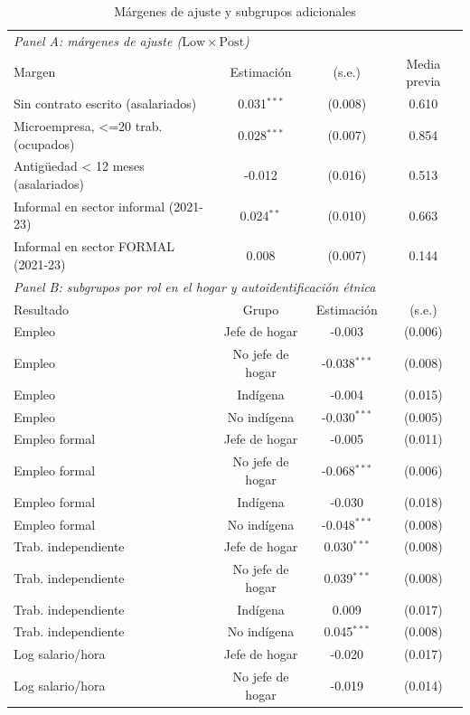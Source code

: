 \begin{table}[!tbp]\centering
\caption{Márgenes de ajuste y subgrupos adicionales}\label{tab:margins}
\begin{threeparttable}
\footnotesize
\begin{tabular}{lccc}
\toprule
\multicolumn{4}{l}{\emph{Panel A: márgenes de ajuste ($\mathrm{Low}\times\mathrm{Post}$)}} \\
Margen & Estimación & (s.e.) & Media previa \\
\midrule
Sin contrato escrito (asalariados) & 0.031$^{***}$ & (0.008) & 0.610 \\
Microempresa, <=20 trab. (ocupados) & 0.028$^{***}$ & (0.007) & 0.854 \\
Antigüedad < 12 meses (asalariados) & -0.012 & (0.016) & 0.513 \\
Informal en sector informal (2021-23) & 0.024$^{**}$ & (0.010) & 0.663 \\
Informal en sector FORMAL (2021-23) & 0.008 & (0.007) & 0.144 \\
\midrule
\multicolumn{4}{l}{\emph{Panel B: subgrupos por rol en el hogar y autoidentificación étnica}} \\
Resultado & Grupo & Estimación & (s.e.) \\ \midrule
Empleo & Jefe de hogar & -0.003 & (0.006) \\
Empleo & No jefe de hogar & -0.038$^{***}$ & (0.008) \\
Empleo & Indígena & -0.004 & (0.015) \\
Empleo & No indígena & -0.030$^{***}$ & (0.005) \\
Empleo formal & Jefe de hogar & -0.005 & (0.011) \\
Empleo formal & No jefe de hogar & -0.068$^{***}$ & (0.006) \\
Empleo formal & Indígena & -0.030 & (0.018) \\
Empleo formal & No indígena & -0.048$^{***}$ & (0.008) \\
Trab. independiente & Jefe de hogar & 0.030$^{***}$ & (0.008) \\
Trab. independiente & No jefe de hogar & 0.039$^{***}$ & (0.008) \\
Trab. independiente & Indígena & 0.009 & (0.017) \\
Trab. independiente & No indígena & 0.045$^{***}$ & (0.008) \\
Log salario/hora & Jefe de hogar & -0.020 & (0.017) \\
Log salario/hora & No jefe de hogar & -0.019 & (0.014) \\

\end{tabular}
\end{threeparttable}
\end{table}
